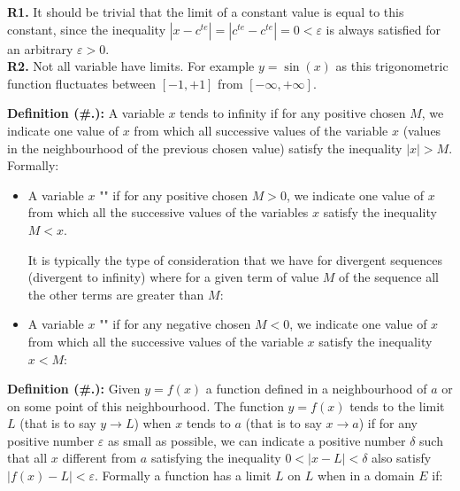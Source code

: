 	\begin{tcolorbox}[title=Remarks,arc=10pt,breakable,drop lifted shadow,
  skin=enhanced,
  skin first is subskin of={enhancedfirst}{arc=10pt,no shadow},
  skin middle is subskin of={enhancedmiddle}{arc=10pt,no shadow},
  skin last is subskin of={enhancedlast}{drop lifted shadow}]
	\textbf{R1.} It should be trivial that the limit of a constant value is equal to this constant, since the inequality $|x-c^{te}|=|c^{te}-c^{te}|=0<\varepsilon $ is always satisfied for an arbitrary $\varepsilon>0$.\\
	
	\textbf{R2.} Not all variable have limits. For example $y=\sin(x)$ as this trigonometric function fluctuates between $[-1,+1]$ from $[-\infty,+\infty]$.
	\end{tcolorbox}
	
	\textbf{Definition (\#\thesection.\mydef):} A variable $x$ tends to infinity if for any positive chosen $M$, we indicate one value of $x$ from which all successive values of the variable $x$ (values in the neighbourhood of the previous chosen value) satisfy the inequality $|x|>M$. Formally:
	
	\begin{itemize}
		\item A variable $x$ "" if for any positive chosen $M>0$, we indicate one value of $x$ from which all the successive values of the variables $x$ satisfy the inequality $M<x$.
	
		It is typically the type of consideration that we have for divergent sequences (divergent to infinity) where for a given term of value $M$ of the sequence all the other terms are greater than $M$:
		
		
		\item A variable $x$ "" if for any negative chosen $M<0$, we indicate one value of $x$ from which all the successive values of the variable $x$ satisfy the inequality $x<M$:
		
	\end{itemize}
	\textbf{Definition (\#\thesection.\mydef):} Given $y=f(x)$ a function defined in a neighbourhood of $a$ or on some point of this neighbourhood. The function $y=f(x)$ tends to the limit $L$ (that is to say $y\rightarrow L$) when $x$ tends to $a$ (that is to say $x\rightarrow a$) if for any positive number $\varepsilon$ as small as possible, we can indicate a positive number $\delta$ such that all $x$ different from $a$ satisfying the inequality $0<|x-L|<\delta$ also satisfy $|f(x)-L|<\varepsilon$. Formally a function has a limit $L$ on $L$ when in a domain $E$ if:
	
